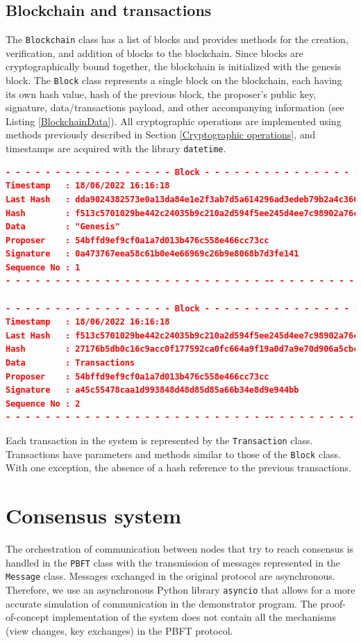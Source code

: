 \subsection{Blockchain and transactions}
The \texttt{Blockchain} class has a list of blocks and provides methods for the creation, verification, and addition of blocks to the blockchain. Since blocks are cryptographically bound together, the blockchain is initialized with the genesis block. The \texttt{Block} class represents a single block on the blockchain, each having its own hash value, hash of the previous block, the proposer's public key, signature, data/transactions payload, and other accompanying information (see Listing \ref{BlockchainData}). All cryptographic operations are implemented using methods previously described in Section \ref{Cryptographic operations}, and timestamps are acquired with the library \texttt{datetime}.
\begin{lstlisting}[language=json,frame=single,breaklines=false, caption={Two blocks chained together to form blockchain.},captionpos=b, label={BlockchainData}]
- - - - - - - - - - - - - - - - - Block - - - - - - - - - - - - - - - - -
Timestamp   : 18/06/2022 16:16:18
Last Hash   : dda9024382573e0a13da84e1e2f3ab7d5a614296ad3edeb79b2a4c366abe
Hash        : f513c5701029be442c24035b9c210a2d594f5ee245d4ee7c98902a76ca05
Data        : "Genesis"
Proposer    : 54bffd9ef9cf0a1a7d013b476c558e466cc73cc
Signature   : 0a473767eea58c61b0e4e66969c26b9e8068b7d3fe141
Sequence No : 1
- - - - - - - - - - - - - - - - - - - - - - - - - - -- - - - - - - - - - -
        
- - - - - - - - - - - - - - - - - Block - - - - - - - - - - - - - - - - - -
Timestamp   : 18/06/2022 16:16:18
Last Hash   : f513c5701029be442c24035b9c210a2d594f5ee245d4ee7c98902a76ca05
Hash        : 27176b5db0c16c9acc0f177592ca0fc664a9f19a0d7a9e70d906a5cbc45d
Data        : Transactions
Proposer    : 54bffd9ef9cf0a1a7d013b476c558e466cc73cc
Signature   : a45c55478caa1d993848d48d85d85a66b34e8d9e944bb
Sequence No : 2
- - - - - - - - - - - - - - - - - - - - - - - - - - -- - - - - - - - - - - 
\end{lstlisting}

Each transaction in the system is represented by the \texttt{Transaction} class. Transactions have parameters and methods similar to those of the \texttt{Block} class. With one exception, the absence of a hash reference to the previous transactions.

\section{Consensus system}
The orchestration of communication between nodes that try to reach consensus is handled in the \texttt{PBFT} class with the transmission of messages represented in the \texttt{Message} class. Messages exchanged in the original protocol are asynchronous. Therefore, we use an asynchronous Python library \texttt{asyncio} that allows for a more accurate simulation of communication in the demonstrator program. The proof-of-concept implementation of the system does not contain all the mechanisms (view changes, key exchanges) in the PBFT protocol.

